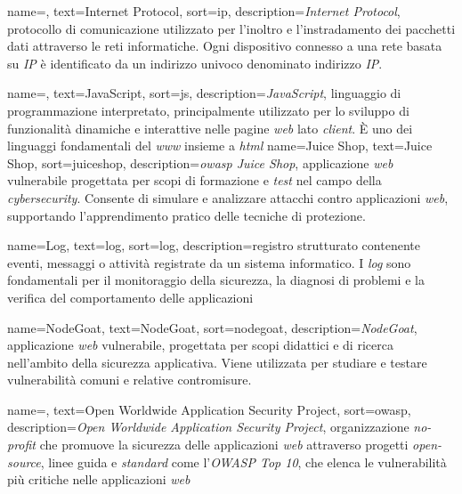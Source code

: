  {
    name=,
    text=Internet Protocol,
    sort=ip,
    description={\emph{Internet Protocol}, protocollo di comunicazione utilizzato per l'inoltro e l'instradamento dei pacchetti dati attraverso le reti informatiche. Ogni dispositivo connesso a una rete basata su \emph{IP} è identificato da un indirizzo univoco denominato indirizzo \emph{IP}.}
}

 {
    name=,
    text=JavaScript,
    sort=js,
    description={\emph{JavaScript}, linguaggio di programmazione interpretato, principalmente utilizzato per lo sviluppo di funzionalità dinamiche e interattive nelle pagine \emph{web} lato \emph{client}. È uno dei linguaggi fondamentali del \emph{\gls{www}} insieme a \emph{\gls{html}}}
}
 {
    name=Juice Shop,
    text=Juice Shop,
    sort=juiceshop,
    description={\emph{\gls{owasp} Juice Shop}, applicazione \emph{web} vulnerabile progettata per scopi di formazione e \emph{test} nel campo della \emph{cybersecurity}. Consente di simulare e analizzare attacchi contro applicazioni \emph{web}, supportando l'apprendimento pratico delle tecniche di protezione.}
}



 {
    name=Log,
    text=log,
    sort=log,
    description={registro strutturato contenente eventi, messaggi o attività registrate da un sistema informatico. I \emph{log} sono fondamentali per il monitoraggio della sicurezza, la diagnosi di problemi e la verifica del comportamento delle applicazioni}
}


 {
    name=NodeGoat,
    text=NodeGoat,
    sort=nodegoat,
    description={\emph{NodeGoat}, applicazione \emph{web} vulnerabile, progettata per scopi didattici e di ricerca nell'ambito della sicurezza applicativa. Viene utilizzata per studiare e testare vulnerabilità comuni e relative contromisure.}
}

 {
    name=,
    text=Open Worldwide Application Security Project,
    sort=owasp,
    description={\emph{Open Worldwide Application Security Project}, organizzazione \emph{no-profit} che promuove la sicurezza delle applicazioni \emph{web} attraverso progetti \emph{open-source}, linee guida e \emph{standard} come l'\emph{OWASP Top 10}, che elenca le vulnerabilità più critiche nelle applicazioni \emph{web}}
}


